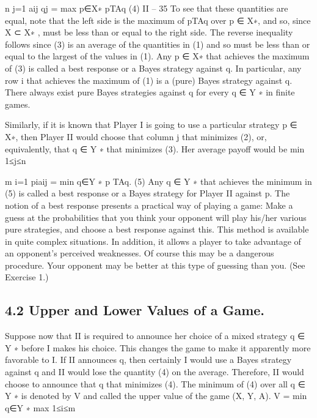 n
j=1
aij qj = max
p∈X∗ pTAq (4)
II – 35
To see that these quantities are equal, note that the left side is the maximum of pTAq over
p ∈ X∗, and so, since X ⊂ X∗ , must be less than or equal to the right side. The reverse
inequality follows since (3) is an average of the quantities in (1) and so must be less than
or equal to the largest of the values in (1).
Any p ∈ X∗ that achieves the maximum of (3) is called a best response or a Bayes
strategy against q. In particular, any row i that achieves the maximum of (1) is a (pure)
Bayes strategy against q. There always exist pure Bayes strategies against q for every
q ∈ Y ∗ in finite games.

Similarly, if it is known that Player I is going to use a particular strategy p ∈ X∗, then
Player II would choose that column j that minimizes (2), or, equivalently, that q ∈ Y ∗
that minimizes (3). Her average payoff would be
min
1≤j≤n

m
i=1
piaij = min
q∈Y ∗ p
TAq. (5)
Any q ∈ Y ∗ that achieves the minimum in (5) is called a best response or a Bayes strategy
for Player II against p.
The notion of a best response presents a practical way of playing a game: Make a
guess at the probabilities that you think your opponent will play his/her various pure
strategies, and choose a best response against this. This method is available in quite
complex situations. In addition, it allows a player to take advantage of an opponent’s
perceived weaknesses. Of course this may be a dangerous procedure. Your opponent may
be better at this type of guessing than you. (See Exercise 1.)

\subsection{4.2 Upper and Lower Values of a Game.} Suppose now that II is required to
announce her choice of a mixed strategy q ∈ Y ∗ before I makes his choice. This changes
the game to make it apparently more favorable to I. If II announces q, then certainly I
would use a Bayes strategy against q and II would lose the quantity (4) on the average.
Therefore, II would choose to announce that q that minimizes (4). The minimum of (4)
over all q ∈ Y ∗ is denoted by V and called the upper value of the game (X, Y, A).
V = min
q∈Y ∗ max
1≤i≤m

